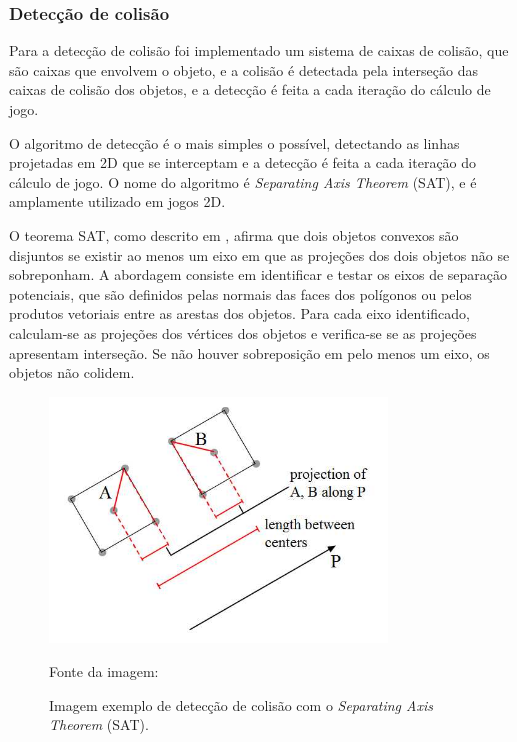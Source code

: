 \subsubsection{Detecção de colisão}

Para a detecção de colisão foi implementado um sistema de caixas de colisão, que são caixas que envolvem o objeto, e a colisão é detectada pela interseção das caixas de colisão dos objetos, e a detecção é feita a cada iteração do cálculo de jogo.

O algoritmo de detecção é o mais simples o possível, detectando as linhas projetadas em 2D que se interceptam e a detecção é feita a cada iteração do cálculo de jogo. O nome do algoritmo é \textit{Separating Axis Theorem} (SAT), e é amplamente utilizado em jogos 2D.

O teorema SAT, como descrito em \cite{SAT:separatingAxisTheorem}, afirma que dois objetos convexos são disjuntos se existir ao menos um eixo em que as projeções dos dois objetos não se sobreponham. A abordagem consiste em identificar e testar os eixos de separação potenciais, que são definidos pelas normais das faces dos polígonos ou pelos produtos vetoriais entre as arestas dos objetos. Para cada eixo identificado, calculam-se as projeções dos vértices dos objetos e verifica-se se as projeções apresentam interseção. Se não houver sobreposição em pelo menos um eixo, os objetos não colidem.

\begin{figure}[H]
    \centering
    \includegraphics[width=0.8\textwidth]{figuras/SAT.jpg}
    \caption{Imagem exemplo de detecção de colisão com o \textit{Separating Axis Theorem} (SAT).}
    \footnotesize{Fonte da imagem: \cite{SAT:separatingAxisTheorem}}
    \label{fig:sat_example}
\end{figure}

